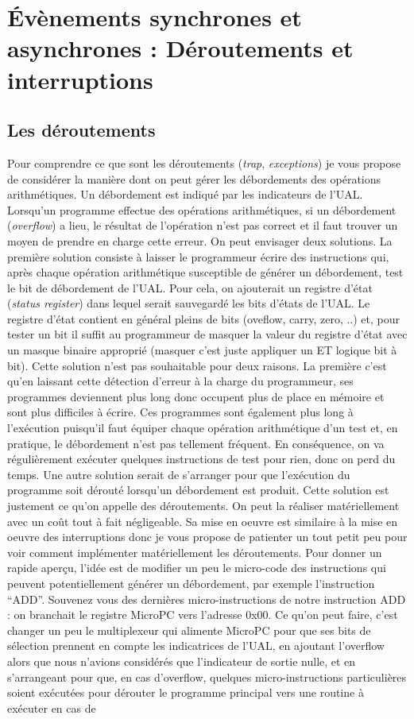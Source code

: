 \section{Évènements synchrones et asynchrones : Déroutements et interruptions}

\subsection{Les déroutements}

Pour comprendre ce que sont les déroutements (\emph{trap}, \emph{exceptions}) je vous propose de considérer la manière dont on peut gérer les débordements des opérations arithmétiques. Un débordement est indiqué par les indicateurs de l'UAL. Lorsqu'un programme effectue des opérations arithmétiques, si un débordement (\emph{overflow}) a lieu, le résultat de l'opération n'est pas correct et il faut trouver un moyen de prendre en charge cette erreur. On peut envisager deux solutions. La première solution consiste à laisser le programmeur écrire des instructions qui, après chaque opération arithmétique susceptible de générer un débordement, test le bit de débordement de l'UAL. Pour cela, on ajouterait un registre d'état (\emph{status register}) dans lequel serait sauvegardé les bits d'états de l'UAL. Le registre d'état contient en général pleins de bits (oveflow, carry, zero, ..) et, pour tester un bit il suffit au programmeur de masquer la valeur du registre d'état avec un masque binaire approprié (masquer c'est juste appliquer un ET logique bit à bit). Cette solution n'est pas souhaitable pour deux raisons. La première c'est qu'en laissant cette détection d'erreur à la charge du programmeur, ses programmes deviennent plus long donc occupent plus de place en mémoire et sont plus difficiles à écrire. Ces programmes sont également plus long à l'exécution puisqu'il faut équiper chaque opération arithmétique d'un test et, en pratique, le débordement n'est pas tellement fréquent. En conséquence, on va régulièrement exécuter quelques instructions de test pour rien, donc on perd du temps. Une autre solution serait de s'arranger pour que l'exécution du programme soit dérouté lorsqu'un débordement est produit. Cette solution est justement ce qu'on appelle des déroutements. On peut la réaliser matériellement avec un coût tout à fait négligeable. Sa mise en oeuvre est similaire à la mise en oeuvre des interruptions donc je vous propose de patienter un tout petit peu pour voir comment implémenter matériellement les déroutements. Pour donner un rapide aperçu, l'idée est de modifier un peu le micro-code des instructions qui peuvent potentiellement générer un débordement, par exemple l'instruction ``ADD''. Souvenez vous des dernières micro-instructions de notre instruction ADD : on branchait le registre MicroPC vers l'adresse 0x00. Ce qu'on peut faire, c'est changer un peu le multiplexeur qui alimente MicroPC pour que ses bits de sélection prennent en compte les indicatrices de l'UAL, en ajoutant l'overflow alors que nous n'avions considérés que l'indicateur de sortie nulle, et en s'arrangeant pour que, en cas d'overflow, quelques micro-instructions particulières soient exécutées pour dérouter le programme principal vers une routine à exécuter en cas de 